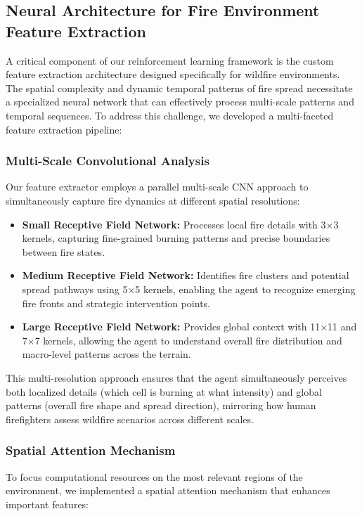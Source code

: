 \documentclass[conference]{IEEEtran}
\begin{document}
\subsection{Neural Architecture for Fire Environment Feature Extraction}

A critical component of our reinforcement learning framework is the custom feature extraction architecture designed specifically for wildfire environments. The spatial complexity and dynamic temporal patterns of fire spread necessitate a specialized neural network that can effectively process multi-scale patterns and temporal sequences. To address this challenge, we developed a multi-faceted feature extraction pipeline:

\subsubsection{Multi-Scale Convolutional Analysis}
Our feature extractor employs a parallel multi-scale CNN approach to simultaneously capture fire dynamics at different spatial resolutions:

\begin{itemize}
    \item \textbf{Small Receptive Field Network:} Processes local fire details with 3×3 kernels, capturing fine-grained burning patterns and precise boundaries between fire states.
    
    \item \textbf{Medium Receptive Field Network:} Identifies fire clusters and potential spread pathways using 5×5 kernels, enabling the agent to recognize emerging fire fronts and strategic intervention points.
    
    \item \textbf{Large Receptive Field Network:} Provides global context with 11×11 and 7×7 kernels, allowing the agent to understand overall fire distribution and macro-level patterns across the terrain.
\end{itemize}

This multi-resolution approach ensures that the agent simultaneously perceives both localized details (which cell is burning at what intensity) and global patterns (overall fire shape and spread direction), mirroring how human firefighters assess wildfire scenarios across different scales.

\subsubsection{Spatial Attention Mechanism}
To focus computational resources on the most relevant regions of the environment, we implemented a spatial attention mechanism that enhances important features:
\end{document}
